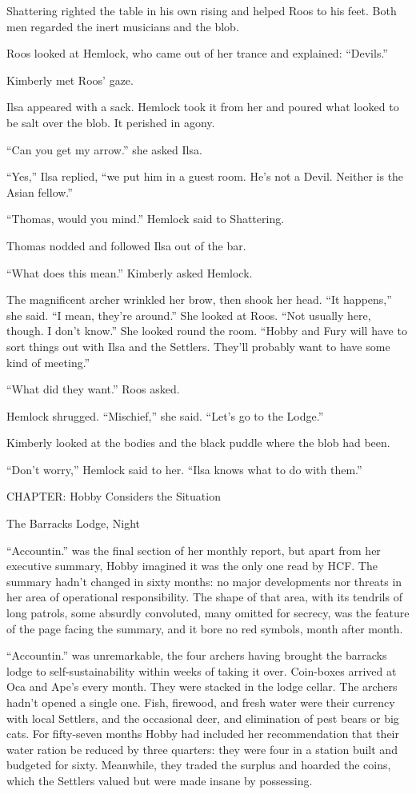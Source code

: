 \documentclass[11pt,a5paper]{article}
\begin{document}
Shattering righted the table in his own rising and helped Roos to his feet. Both men regarded the inert musicians and the blob.

Roos looked at Hemlock, who came out of her trance and explained: ``Devils.''

Kimberly met Roos' gaze.

Ilsa appeared with a sack. Hemlock took it from her and poured what looked to be salt over the blob. It perished in agony.

``Can you get my arrow.'' she asked Ilsa.

``Yes,'' Ilsa replied, ``we put him in a guest room. He's not a Devil. Neither is the Asian fellow.''

``Thomas, would you mind.'' Hemlock said to Shattering.

Thomas nodded and followed Ilsa out of the bar.

``What does this mean.'' Kimberly asked Hemlock.

The magnificent archer wrinkled her brow, then shook her head. ``It happens,'' she said. ``I mean, they're around.'' She looked at Roos. ``Not usually here, though. I don't know.'' She looked round the room. ``Hobby and Fury will have to sort things out with Ilsa and the Settlers. They'll probably want to have some kind of meeting.''

``What did they want.'' Roos asked.

Hemlock shrugged. ``Mischief,'' she said. ``Let's go to the Lodge.''

Kimberly looked at the bodies and the black puddle where the blob had been.

``Don't worry,'' Hemlock said to her. ``Ilsa knows what to do with them.''



CHAPTER: Hobby Considers the Situation

The Barracks Lodge, Night



``Accountin.'' was the final section of her monthly report, but apart from her executive summary, Hobby imagined it was the only one read by HCF. The summary hadn't changed in sixty months: no major developments nor threats in her area of operational responsibility. The shape of that area, with its tendrils of long patrols, some absurdly convoluted, many omitted for secrecy, was the feature of the page facing the summary, and it bore no red symbols, month after month.

``Accountin.'' was unremarkable, the four archers having brought the barracks lodge to self-sustainability within weeks of taking it over. Coin-boxes arrived at Oca and Ape's every month. They were stacked in the lodge cellar. The archers hadn't opened a single one. Fish, firewood, and fresh water were their currency with local Settlers, and the occasional deer, and elimination of pest bears or big cats. For fifty-seven months Hobby had included her recommendation that their water ration be reduced by three quarters: they were four in a station built and budgeted for sixty. Meanwhile, they traded the surplus and hoarded the coins, which the Settlers valued but were made insane by possessing.
\end{document}
